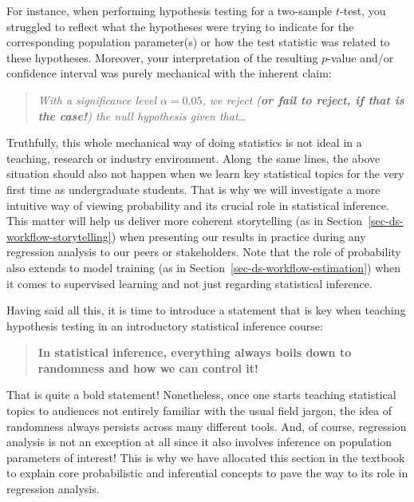 \documentclass[
  letterpaper,
  DIV=11,
  numbers=noendperiod]{scrreprt}
\begin{document}
For instance, when performing hypothesis testing for a two-sample
\(t\)-test, you struggled to reflect what the hypotheses were trying to
indicate for the corresponding population parameter(s) or how the test
statistic was related to these hypotheses. Moreover, your interpretation
of the resulting \(p\)-value and/or confidence interval was purely
mechanical with the inherent claim:

\begin{quote}
\emph{With a significance level \(\alpha = 0.05\), we reject (\textbf{or
fail to reject, if that is the case!}) the null hypothesis given
that\ldots{}}
\end{quote}

Truthfully, this whole mechanical way of doing statistics is not ideal
in a teaching, research or industry environment. Along~the same lines,
the above situation should also not happen when we learn key statistical
topics for the very first time as undergraduate students. That is why we
will investigate a more intuitive way of viewing probability and its
crucial role in statistical inference. This matter will help us deliver
more coherent storytelling (as in
Section~\ref{sec-ds-workflow-storytelling}) when presenting our results
in practice during any regression analysis to our peers or stakeholders.
Note that the role of probability also extends to model training (as in
Section~\ref{sec-ds-workflow-estimation}) when it comes to supervised
learning and not just regarding statistical inference.

Having said all this, it is time to introduce a statement that is key
when teaching hypothesis testing in an introductory statistical
inference course:

\begin{quote}
\textbf{In statistical inference, everything always boils down to
randomness and how we can control it!}
\end{quote}

That is quite a bold statement! Nonetheless, once one starts teaching
statistical topics to audiences not entirely familiar with the usual
field jargon, the idea of randomness always persists across many
different tools. And, of course, regression analysis is not an exception
at all since it also involves inference on population parameters of
interest! This is why we have allocated this section in the textbook to
explain core probabilistic and inferential concepts to pave the way to
its role in regression analysis.
\end{document}
